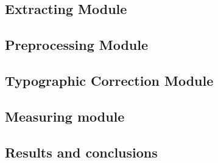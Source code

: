 \subsection{Extracting Module} \label{ssection:extmod}

\subsection{Preprocessing Module} \label{ssection:prepmod}

\subsection{Typographic Correction Module} \label{ssection:typomod}

\subsection{Measuring module} \label{ssection:measmod}

\subsection{Results and conclusions} \label{ssection:resconc}
